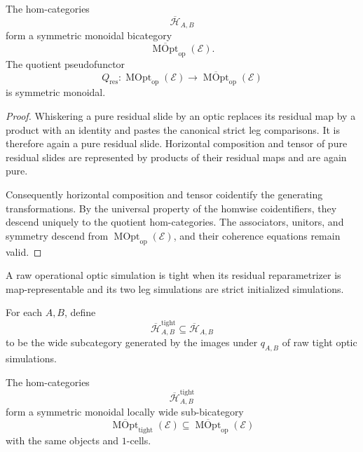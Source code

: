 \begin{theorem}
\label{thm:residual-codescent-optics}
The hom-categories
\[
  \overline{\mathcal H}_{A,B}
\]
form a symmetric monoidal bicategory
\[
  \overline{\operatorname{MOpt}}_{\mathrm{op}}(\mathcal E).
\]
The quotient pseudofunctor
\[
  Q_{\mathrm{res}}:
  \operatorname{MOpt}_{\mathrm{op}}(\mathcal E)
  \longrightarrow
  \overline{\operatorname{MOpt}}_{\mathrm{op}}(\mathcal E)
\]
is symmetric monoidal.
\end{theorem}

\begin{proof}
Whiskering a pure residual slide by an optic replaces its residual map by a product with an identity
and pastes the canonical strict leg comparisons. It is therefore again a pure residual slide.
Horizontal composition and tensor of pure residual slides are represented by products of their
residual maps and are again pure.

Consequently horizontal composition and tensor coidentify the generating transformations. By the
universal property of the homwise coidentifiers, they descend uniquely to the quotient
hom-categories. The associators, unitors, and symmetry descend from
\(\operatorname{MOpt}_{\mathrm{op}}(\mathcal E)\), and their coherence equations remain valid.
\end{proof}

\begin{definition}
\label{def:raw-tight-optic-simulation}
A raw operational optic simulation is tight when its residual reparametrizer is map-representable
and its two leg simulations are strict initialized simulations.
\end{definition}

For each \(A,B\), define
\[
  \overline{\mathcal H}^{\mathrm{tight}}_{A,B}
  \subseteq
  \overline{\mathcal H}_{A,B}
\]
to be the wide subcategory generated by the images under \(q_{A,B}\) of raw tight optic
simulations.

\begin{proposition}
\label{prop:tight-fragment}
The hom-categories
\[
  \overline{\mathcal H}^{\mathrm{tight}}_{A,B}
\]
form a symmetric monoidal locally wide sub-bicategory
\[
  \overline{\operatorname{MOpt}}_{\mathrm{tight}}(\mathcal E)
  \subseteq
  \overline{\operatorname{MOpt}}_{\mathrm{op}}(\mathcal E)
\]
with the same objects and \(1\)-cells.
\end{proposition}

